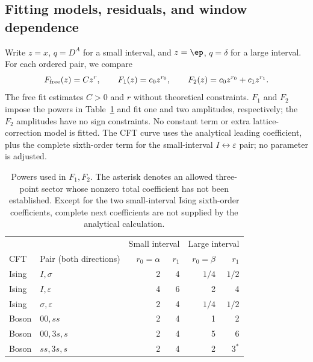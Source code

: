 \subsection{Fitting models, residuals, and window dependence}
\label{app:num-fitting}
Write $z=x$, $q=D^A$ for a small interval, and
$z=\ep$, $q=\delta$ for a large interval. For each ordered pair,
we compare
\begin{equation}
 F_{\rm free}(z)=Cz^r,\qquad
 F_1(z)=c_0z^{r_0},\qquad
 F_2(z)=c_0z^{r_0}+c_1z^{r_1}.
 \label{eq:num-fits}
\end{equation}
The free fit estimates $C>0$ and $r$ without theoretical
constraints. $F_1$ and $F_2$ impose the powers in
Table~\ref{tab:num-powers} and fit one and two amplitudes,
respectively; the $F_2$ amplitudes have no sign constraints.
No constant term or extra lattice-correction model is fitted.
The CFT curve uses the analytical leading coefficient, plus
the complete sixth-order term for the small-interval
$I\leftrightarrow\varepsilon$ pair; no parameter is adjusted.
\begin{table}[htbp]\centering\small
\begin{tabular}{llrrrr}\toprule
 & & \multicolumn{2}{c}{Small interval} & \multicolumn{2}{c}{Large interval}\\
CFT & Pair (both directions) & $r_0=\alpha$ & $r_1$ & $r_0=\beta$ & $r_1$\\\midrule
Ising & $I,\sigma$ & 2 & 4 & $1/4$ & $1/2$\\
Ising & $I,\varepsilon$ & 4 & 6 & 2 & 4\\
Ising & $\sigma,\varepsilon$ & 2 & 4 & $1/4$ & $1/2$\\
Boson & $00,ss$ & 2 & 4 & 1 & 2\\
Boson & $00,3s,s$ & 2 & 4 & 5 & 6\\
Boson & $ss,3s,s$ & 2 & 4 & 2 & $3^{*}$\\\bottomrule
\end{tabular}
\caption{Powers used in $F_1,F_2$. The asterisk denotes an
allowed three-point sector whose nonzero total coefficient
has not been established. Except for the two small-interval
Ising sixth-order coefficients, complete next coefficients
are not supplied by the analytical calculation.}
\label{tab:num-powers}
\end{table}

